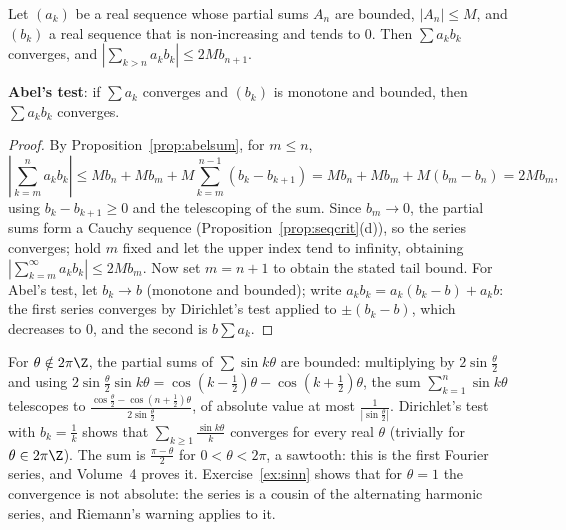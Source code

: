 \begin{theorem}\label{thm:dirichlettest}
Let $(a_k)$ be a real sequence whose partial sums $A_n$ are bounded, $|A_n|\le M$, and $(b_k)$ a real sequence that is non-increasing and tends to $0$. Then
$\sum a_kb_k$ converges, and $\left|\sum_{k>n}a_kb_k\right|\le2Mb_{n+1}$.

\textbf{Abel's test}: if $\sum a_k$ converges and $(b_k)$ is monotone and bounded, then $\sum a_kb_k$ converges.
\end{theorem}
\begin{proof}
By Proposition~\ref{prop:abelsum}, for $m\le n$,
\[
\left|\sum_{k=m}^na_kb_k\right|\le Mb_n+Mb_m+M\sum_{k=m}^{n-1}(b_k-b_{k+1})=Mb_n+Mb_m+M(b_m-b_n)=2Mb_m,
\]
using $b_k-b_{k+1}\ge0$ and the telescoping of the sum. Since $b_m\to0$, the partial sums form a Cauchy sequence (Proposition~\ref{prop:seqcrit}(d)), so the series converges;
hold $m$ fixed and let the upper index tend to infinity, obtaining $|\sum_{k=m}^\infty a_kb_k|\le2Mb_m$. Now set $m=n+1$ to obtain the stated tail bound. For Abel's test, let $b_k\to b$ (monotone and bounded); write $a_kb_k=a_k(b_k-b)+a_kb$: the first series converges
by Dirichlet's test applied to $\pm(b_k-b)$, which decreases to $0$, and the second is $b\sum a_k$.
\end{proof}

\begin{examplex}
For $\theta\notin2\pi\Z$, the partial sums of $\sum\sin k\theta$ are bounded: multiplying by $2\sin\frac\theta2$ and using $2\sin\frac\theta2\sin k\theta=\cos\left(k-\frac12\right)\theta-\cos\left(k+\frac12\right)\theta$,
the sum $\sum_{k=1}^n\sin k\theta$ telescopes to $\frac{\cos\frac\theta2-\cos\left(n+\frac12\right)\theta}{2\sin\frac\theta2}$, of absolute value at most $\frac1{|\sin\frac\theta2|}$. Dirichlet's test with $b_k=\frac1k$
shows that $\sum_{k\ge1}\frac{\sin k\theta}k$ converges for every real $\theta$ (trivially for $\theta\in2\pi\Z$). The sum is $\frac{\pi-\theta}2$ for $0<\theta<2\pi$, a sawtooth: this is the
first Fourier series, and Volume~4 proves it. Exercise~\ref{ex:sinn} shows that for $\theta=1$ the convergence is not absolute: the series is a cousin of the alternating harmonic
series, and Riemann's warning applies to it.
\end{examplex}



